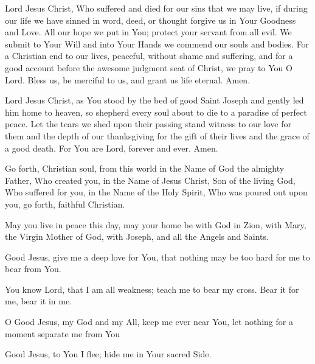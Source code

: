 Lord Jesus Christ, Who suffered and died for our sins that we may live, if during our life we have sinned in word, deed, or thought forgive us in Your Goodness and Love.
All our hope we put in You;
protect your servant \insertname from all evil.
We submit to Your Will and into Your Hands we commend our souls and bodies.
For a Christian end to our lives, peaceful, without shame and suffering, and for a good account before the awesome judgment seat of Christ, we pray to You O Lord.
Bless us, be merciful to us, and grant us life eternal.
Amen.

Lord Jesus Christ, as You stood by the bed of good Saint Joseph and gently led him home to heaven, so shepherd every soul about to die to a paradise of perfect peace.
Let the tears we shed upon their passing stand witness to our love for them and the depth of our thanksgiving for the gift of their lives and the grace of a good death.
For You are Lord, forever and ever.
Amen.

Go forth, Christian soul, from this world in the Name of God the almighty Father, Who created you, in the Name of Jesus Christ, Son of the living God, Who suffered for you, in the Name of the Holy Spirit, Who was poured out upon you, go forth, faithful Christian.

May you live in peace this day, may your home be with God in Zion, with Mary, the Virgin Mother of God, with Joseph, and all the Angels and Saints.

Good Jesus, give me a deep love for You, that nothing may be too hard for me to bear from You.

You know Lord, that I am all weakness; teach me to bear my cross.
Bear it for me, bear it in me.

O Good Jesus, my God and my All, keep me ever near You, let nothing for a moment separate me from You

Good Jesus, to You I flee;
hide me in Your sacred Side.

